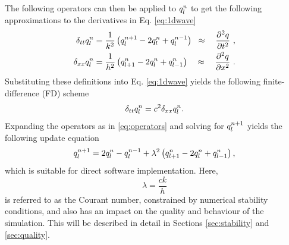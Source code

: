 The following operators can then be applied to $q_l^n$ to get the following approximations to the derivatives in Eq. \eqref{eq:1dwave}
\begin{subequations}\label{eq:operators}
    \begin{align}
         \delta_{tt}q_l^n &= \frac{1}{k^2}\left(q_l^{n+1}-2q_l^n + q_l^{n-1}\right)\;\;\approx\quad\frac{\partial^2q}{\partial t^2}\label{eq:secondOrderTime}\ ,\\
         \delta_{xx}q_l^n &= \frac{1}{h^2}\left(q_{l+1}^n-2q_l^n + q_{l-1}^n\right)\quad\approx\quad \frac{\partial^2q}{\partial x^2}\ .\label{eq:secondOrderSpace}
    \end{align}
\end{subequations}
Substituting these definitions into Eq. \eqref{eq:1dwave} yields the following finite-difference (FD) scheme
\begin{equation}\label{eq:FDS}
    \delta_{tt}q_l^n = c^2 \delta_{xx}q_l^n.
\end{equation}
%
Expanding the operators as in %
\eqref{eq:operators} and solving for $q_l^{n+1}$ yields the following update equation
\begin{equation}\label{eq:updateEq}
    q_l^{n+1} = 2q_l^n-q_l^{n-1} + \lambda^2 \left(q_{l+1}^n-2q_l^n + q_{l-1}^n\right),
\end{equation}
which is suitable for direct software implementation. %
Here,
\begin{equation}\label{eq:lambdaDef}
    \lambda = \frac{ck}{h}
\end{equation}
is referred to as the Courant number, constrained by numerical stability conditions, and also has an impact on the quality and behaviour of the simulation. This will be described in detail in Sections \ref{sec:stability} and \ref{sec:quality}.

